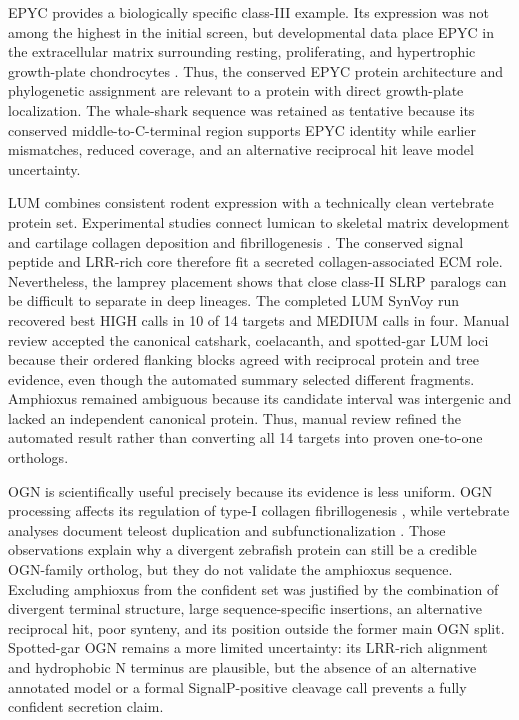 EPYC provides a biologically specific class-III example. Its expression was not
among the highest in the initial screen, but developmental data place EPYC in
the extracellular matrix surrounding resting, proliferating, and hypertrophic
growth-plate chondrocytes \citep{Johnson1999}. Thus, the conserved EPYC protein
architecture and phylogenetic assignment are relevant to a protein with direct
growth-plate localization. The whale-shark sequence was retained as tentative
because its conserved middle-to-C-terminal region supports EPYC identity while
earlier mismatches, reduced coverage, and an alternative reciprocal hit leave
model uncertainty.

LUM combines consistent rodent expression with a technically clean vertebrate
protein set. Experimental studies connect lumican to skeletal matrix development
and cartilage collagen deposition and fibrillogenesis
\citep{Raouf2002,Kafienah2008}. The conserved signal peptide and LRR-rich core
therefore fit a secreted collagen-associated ECM role. Nevertheless, the
lamprey placement shows that close class-II SLRP paralogs can be difficult to
separate in deep lineages. The completed LUM SynVoy run recovered best HIGH
calls in 10 of 14 targets and MEDIUM calls in four. Manual review accepted the
canonical catshark, coelacanth, and spotted-gar LUM loci because their ordered
flanking blocks agreed with reciprocal protein and tree evidence, even though
the automated summary selected different fragments. Amphioxus remained
ambiguous because its candidate interval was intergenic and lacked an
independent canonical protein. Thus, manual review refined the automated result
rather than converting all 14 targets into proven one-to-one orthologs.

OGN is scientifically useful precisely because its evidence is less uniform.
OGN processing affects its regulation of type-I collagen fibrillogenesis
\citep{Ge2004}, while vertebrate analyses document teleost duplication and
subfunctionalization \citep{Costa2018}. Those observations explain why a
divergent zebrafish protein can still be a credible OGN-family ortholog, but they
do not validate the amphioxus sequence. Excluding amphioxus from the confident
set was justified by the combination of divergent terminal structure, large
sequence-specific insertions, an alternative reciprocal hit, poor synteny, and
its position outside the former main OGN split. Spotted-gar OGN remains a more
limited uncertainty: its LRR-rich alignment and hydrophobic N terminus are
plausible, but the absence of an alternative annotated model or a formal
SignalP-positive cleavage call prevents a fully confident secretion claim.

